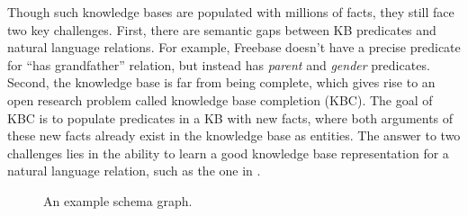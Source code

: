Though such knowledge bases are populated with millions of facts,
they still face two key challenges.
First, there are semantic gaps between KB predicates and
natural language relations.
For example, Freebase doesn't have a precise predicate for
``has grandfather'' relation,
but instead has \textit{parent} and \textit{gender} predicates.
Second, the knowledge base is far from being complete, which gives rise to
an open research problem called knowledge base completion (KBC).
The goal of KBC is to populate predicates in a KB with new facts,
where both arguments of these new facts already exist in the knowledge base
as entities.
The answer to two challenges lies in the ability to
learn a good knowledge base representation for a natural language
relation, such as the one in .

\begin{figure}[t]
\centering
\caption{An example schema graph.}
\label{fig:kb-schema}
\end{figure}


